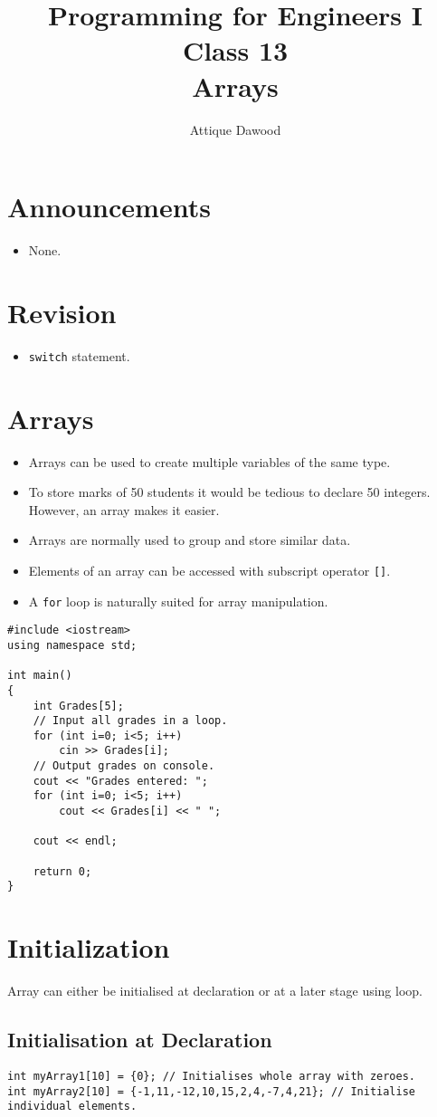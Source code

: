 \documentclass[12pt,a4paper]{article}
\title{\vspace{-2cm}Programming for Engineers I\\Class 13\\Arrays}
\author{Attique Dawood}
\begin{document}
\maketitle
\section{Announcements}
\begin{itemize}
\item None.
\end{itemize}
\section{Revision}
\begin{itemize}
\item \verb|switch| statement.
\end{itemize}
\section{Arrays}
\begin{itemize}
\item Arrays can be used to create multiple variables of the same type.
\item To store marks of 50 students it would be tedious to declare 50 integers. However, an array makes it easier.
\item Arrays are normally used to group and store similar data.
\item Elements of an array can be accessed with subscript operator \verb|[]|.
\item A \verb|for| loop is naturally suited for array manipulation.
\end{itemize}
\begin{lstlisting}[caption={A Simple Array}]
#include <iostream>
using namespace std;

int main()
{
	int Grades[5];
	// Input all grades in a loop.
	for (int i=0; i<5; i++)
		cin >> Grades[i];
	// Output grades on console.
	cout << "Grades entered: ";
	for (int i=0; i<5; i++)
		cout << Grades[i] << " ";

	cout << endl;

	return 0;
}
\end{lstlisting}
\section{Initialization}
Array can either be initialised at declaration or at a later stage using loop.
\subsection{Initialisation at Declaration}
\begin{lstlisting}[caption={Array initialisation at declaration}]
int myArray1[10] = {0}; // Initialises whole array with zeroes.
int myArray2[10] = {-1,11,-12,10,15,2,4,-7,4,21}; // Initialise individual elements.
\end{lstlisting}
\end{document}
